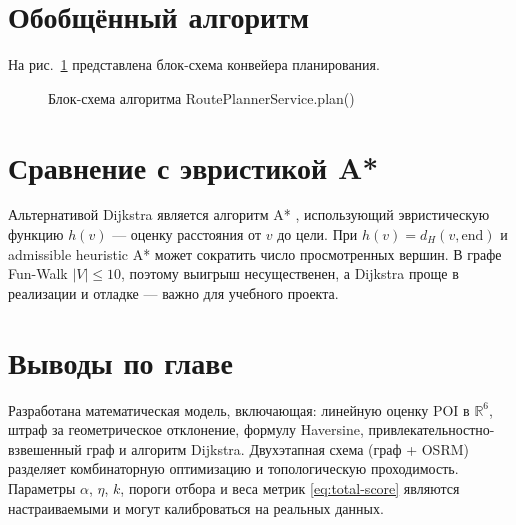 \section{Обобщённый алгоритм}

На рис.~\ref{fig:algorithm-flow} представлена блок-схема конвейера планирования.

\begin{figure}[H]
\centering
{}
\caption{Блок-схема алгоритма RoutePlannerService.plan()}
\label{fig:algorithm-flow}
\end{figure}

\section{Сравнение с эвристикой A*}

Альтернативой Dijkstra является алгоритм A* \cite{hart1968}, использующий
эвристическую функцию $h(v)$ --- оценку расстояния от $v$ до цели. При
$h(v) = d_H(v, \mathrm{end})$ и admissible heuristic A* может сократить число
просмотренных вершин. В графе Fun-Walk $|V| \leq 10$, поэтому выигрыш
несущественен, а Dijkstra проще в реализации и отладке --- важно для
учебного проекта.

\section{Выводы по главе}

Разработана математическая модель, включающая: линейную оценку POI в $\mathbb{R}^6$,
штраф за геометрическое отклонение, формулу Haversine, привлекательностно-взвешенный
граф и алгоритм Dijkstra. Двухэтапная схема (граф + OSRM) разделяет комбинаторную
оптимизацию и топологическую проходимость. Параметры $\alpha$, $\eta$, $k$, пороги
отбора и веса метрик \eqref{eq:total-score} являются настраиваемыми и могут
калиброваться на реальных данных.
